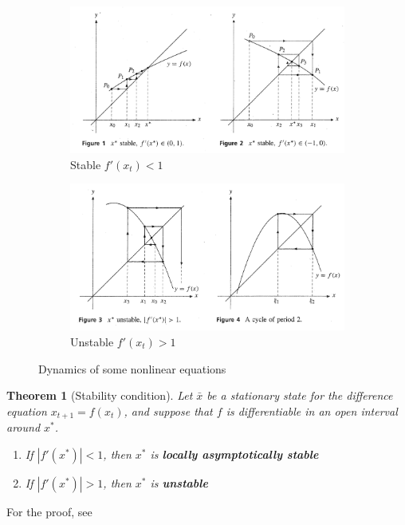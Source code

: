 \documentclass[11pt,a4paper]{book}
\newtheorem{theorem}{Theorem}[section]
\theoremstyle{definition}\newtheorem{definition}{Definition}
\theoremstyle{definition}\newtheorem{fact}{Fact}
\theoremstyle{definition}\newtheorem{remark}{Remark}
\theoremstyle{definition}\newtheorem{ex}{Ex.}
\theoremstyle{definition}\newtheorem{project}{Project}
\theoremstyle{definition}\newtheorem{problem}{Problem}
\theoremstyle{definition}\newtheorem{example}{Example}
\newenvironment{ftheorem}
{\begin{mdframed}\begin{theorem}}
		{\end{theorem}\end{mdframed}}
\numberwithin{theorem}{section}
\numberwithin{corollary}{chapter}
\numberwithin{assumption}{chapter}
\numberwithin{definition}{chapter}
\numberwithin{prop}{chapter}
\numberwithin{notation}{chapter}
\numberwithin{problem}{chapter}
\numberwithin{example}{chapter}
\numberwithin{fact}{chapter}
\numberwithin{ex}{chapter}
\begin{document}
	\begin{figure}[ht]
		\centering
		\begin{subfigure}[b]{0.63\textwidth}
			\includegraphics[width=1\linewidth]{figs/page417_1.png}
			\caption{Stable $f'(x_t) < 1$ }
			\label{fig:Ng1} 
		\end{subfigure}
		\begin{subfigure}[b]{0.63\textwidth}
			\includegraphics[width=1\linewidth]{figs/page417_2.png}
			\caption{Unstable $f'(x_t) > 1$}
			\label{fig:Ng2}
		\end{subfigure}
		\caption{Dynamics of some nonlinear equations \citep[p.420]{sydsaeter2008further}}
		\label{fig:diff2}
	\end{figure}
	
	\begin{ftheorem}[Stability condition] \label{theorem:stability}
		Let $\bar{x}$ be a stationary state for the difference equation $x_{t+1} = f(x_t)$, and suppose that $f$ is differentiable in an open interval around $x^*$.
		\begin{enumerate}
			\item If $|f'(x^*)| < 1$, then $x^*$ is \textbf{locally asymptotically stable}
			\item If $|f'(x^*)| > 1$, then $x^*$ is \textbf{unstable}
		\end{enumerate}
	\end{ftheorem}
	For the proof, see \citet[p.419]{sydsaeter2008further}
	
\end{document}
